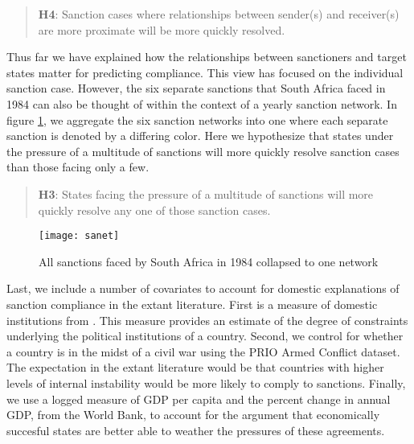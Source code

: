 \begin{quote}
	\textbf{H4}: Sanction cases where relationships between sender(s) and receiver(s) are more proximate will be more quickly resolved.
\end{quote}

Thus far we have explained how the relationships between sanctioners and target states matter for predicting compliance. This view has focused on the individual sanction case. However, the six separate sanctions that South Africa faced in 1984 can also be thought of within the context of a yearly sanction network. In figure \ref{fig:sanet}, we aggregate the six sanction networks into one where each separate sanction is denoted by a differing color. Here we hypothesize that states under the pressure of a multitude of sanctions will more quickly resolve sanction cases than those facing only a few.

\begin{quote}
	\textbf{H3}: States facing the pressure of a multitude of sanctions will more quickly resolve any one of those sanction cases.
\end{quote}

\begin{figure}[ht]
	\centering
	\texttt{[image: sanet]}
	\caption{All sanctions faced by South Africa in 1984 collapsed to one network}
	\label{fig:sanet}
\end{figure}
\FloatBarrier

Last, we include a number of covariates to account for domestic explanations of sanction compliance in the extant literature. First is a measure of domestic institutions from \citet{henisz2000a}. This measure provides an estimate of the degree of constraints underlying the political institutions of a country. Second, we control for whether a country is in the midst of a civil war using the PRIO Armed Conflict dataset. The expectation in the extant literature would be that countries with higher levels of internal instability would be more likely to comply to sanctions. Finally, we use a logged measure of GDP per capita and the percent change in annual GDP, from the World Bank, to account for the argument that economically succesful states are better able to weather the pressures of these agreements.

